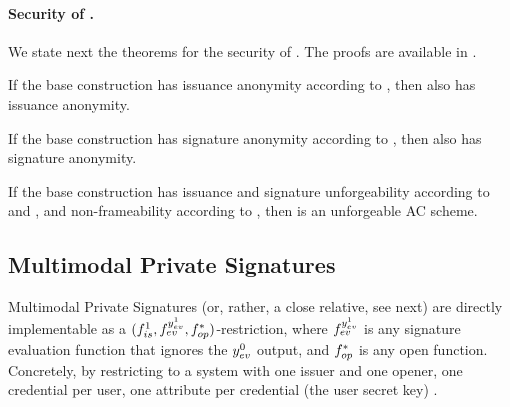 \paragraph{Security of \CUASDAC.} %
We state next the theorems for the security of \CUASDAC. The proofs are
available in .

\begin{theorem}
  If the base \CUASGen construction has issuance anonymity according to
  , then \CUASDAC also has issuance anonymity.
\end{theorem}

\begin{theorem}
  If the base \CUASGen construction has signature anonymity according to
  , then \CUASDAC also has signature anonymity.
\end{theorem}

\begin{theorem}
  If the base \CUASGen construction has issuance and signature unforgeability
  according to  and , and
  non-frameability according to , then \CUASAC is an
  unforgeable AC scheme.
\end{theorem}

\subsection{Multimodal Private Signatures}
\label{ssec:related-models-mps}

Multimodal Private Signatures (or, rather, a close relative, see next) are
directly implementable as a $(f_{is}^1,f_{ev}^{y_{ev}^1},
f_{op}^{\ast})$-\CUASGen restriction, where $f_{ev}^{y_{ev}^1}$ is any signature
evaluation function that ignores the $y_{ev}^0$ output, and $f_{op}^{\ast}$ is
any open function. Concretely, by restricting to a system with one issuer and
one opener, one credential per user, one attribute per credential (the user
secret key)%
.


